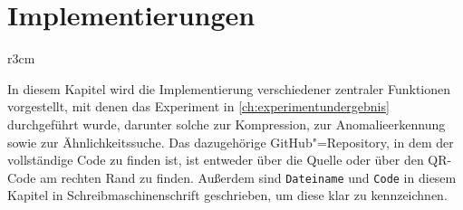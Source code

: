 \chapter{Implementierungen}
\begin{wrapfigure}{r}{3cm}
    \centering
\end{wrapfigure}

In diesem Kapitel wird die Implementierung verschiedener zentraler Funktionen vorgestellt, mit denen das Experiment in \autoref{ch:experimentundergebnis} durchgeführt wurde, darunter solche zur Kompression, zur Anomalieerkennung sowie zur Ähnlichkeitssuche. Das dazugehörige GitHub"=Repository, in dem der vollständige Code zu finden ist, ist entweder über die Quelle \cite{meinGithubCode} oder über den QR-Code am rechten Rand zu finden. Außerdem sind \texttt{Dateiname} und \texttt{Code} in diesem Kapitel in Schreibmaschinenschrift geschrieben, um diese klar zu kennzeichnen. 



